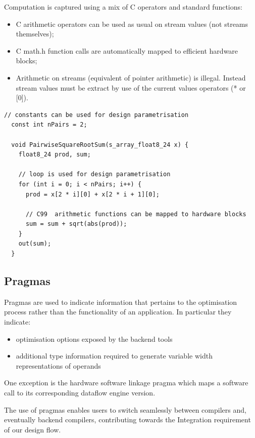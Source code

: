 Computation is captured using a mix of C operators and standard
functions:
\begin{itemize}
\item C arithmetic operators can be used as usual on stream values (not streams themselves);
\item C math.h function calls are automatically mapped to efficient hardware blocks;
\item Arithmetic on streams (equivalent of pointer arithmetic) is
  illegal. Instead stream values must be extract by use of the current
  values operators (* or [0]).
\end{itemize}

\begin{lstlisting}[caption={Compute and control example in \FAST{}}, label={lst:fast-compute-control}]
  // constants can be used for design parametrisation
  const int nPairs = 2;

  void PairwiseSquareRootSum(s_array_float8_24 x) {
    float8_24 prod, sum;

    // loop is used for design parametrisation
    for (int i = 0; i < nPairs; i++) {
      prod = x[2 * i][0] + x[2 * i + 1][0];

      // C99  arithmetic functions can be mapped to hardware blocks
      sum = sum + sqrt(abs(prod));
    }
    out(sum);
  }
\end{lstlisting}

\subsection{Pragmas}

Pragmas are used to indicate information that pertains to the
optimisation process rather than the functionality of an
application. In particular they indicate:
\begin{itemize}
\item optimisation options exposed by the backend tools
\item additional type information required to generate variable width
  representations of operands
\end{itemize}

One exception is the hardware software linkage pragma which maps a
software call to its corresponding dataflow engine version.

The use of pragmas enables users to switch seamlessly between
compilers and, eventually backend compilers, contributing towards the
Integration requirement of our design flow.

